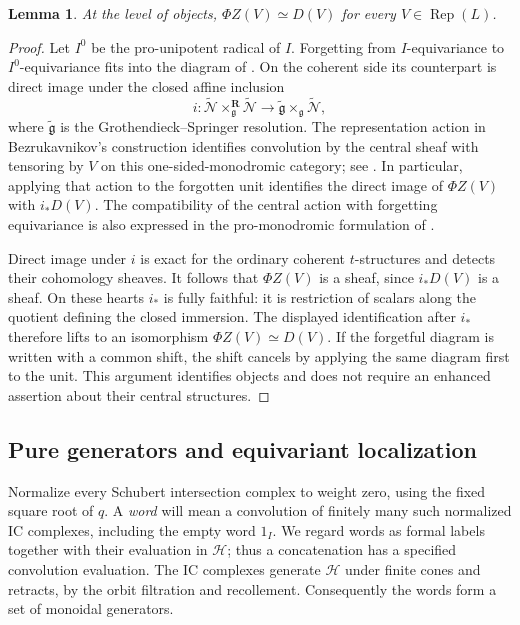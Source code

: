 \documentclass[11pt]{article}
\numberwithin{equation}{section}
\newtheorem{lemma}[theorem]{Lemma}
\theoremstyle{definition}
\theoremstyle{remark}
\newcommand{\g}{\mathfrak g}
\newcommand{\cN}{\mathcal N}
\newcommand{\Rep}{\operatorname{Rep}}
\begin{document}
\begin{lemma}\label{enh:central-objects}
At the level of objects, $\Phi Z(V)\simeq D(V)$ for every
$V\in\Rep(L)$.
\end{lemma}

\begin{proof}
Let $I^0$ be the pro-unipotent radical of $I$.  Forgetting from
$I$-equivariance to $I^0$-equivariance fits into the diagram of
\cite[Theorem~2.17]{Local:BZCHN}.  On the coherent side its counterpart
is direct image under the closed affine inclusion
\[
 i:\widetilde{\cN}\mathbin{\times}^{\mathbf R}_{\g}
                \widetilde{\cN}
   \longrightarrow
   \widetilde{\g}\mathbin{\times}_{\g}\widetilde{\cN},
\]
where $\widetilde{\g}$ is the Grothendieck--Springer resolution.
The representation action in Bezrukavnikov's construction identifies
convolution by the central sheaf with tensoring by $V$ on this
one-sided-monodromic category; see
\cite[Sections~2.2.2, 3.5, 4, and 9--10]{Enh:Bezrukavnikov}.
In particular, applying that action to the forgotten unit identifies
the direct image of $\Phi Z(V)$ with $i_*D(V)$.
The compatibility of the central action with forgetting equivariance
is also expressed in the pro-monodromic formulation of
\cite[Proposition~13]{Enh:Bezrukavnikov}.

Direct image under $i$ is exact for the ordinary coherent
$t$-structures and detects their cohomology sheaves.  It follows that
$\Phi Z(V)$ is a sheaf, since $i_*D(V)$ is a sheaf.
On these hearts $i_*$ is fully faithful: it is restriction of scalars
along the quotient defining the closed immersion.  The displayed
identification after $i_*$ therefore lifts to an isomorphism
$\Phi Z(V)\simeq D(V)$.  If the forgetful diagram is written with a
common shift, the shift cancels by applying the same diagram first to
the unit.  This argument identifies objects and does not require an
enhanced assertion about their central structures.
\end{proof}

\subsection{Pure generators and equivariant localization}

Normalize every Schubert intersection complex to weight zero, using
the fixed square root of $q$.  A \emph{word} will mean a convolution
of finitely many such normalized IC complexes, including the empty
word $1_I$.  We regard words as formal labels together with their
evaluation in $\mathscr H$; thus a concatenation has a specified
convolution evaluation.  The IC complexes generate $\mathscr H$ under
finite cones and retracts, by the orbit filtration and recollement.
Consequently the words form a set of monoidal generators.
\end{document}
